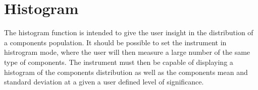 \section{Histogram} \label{sec:5_2_Histogram}
The histogram function is intended to give the user insight in the distribution of a components population. It should be possible to set the instrument in histrogram mode, where the user will then measure a large number of the same type of components. The instrument must then be capable of displaying a histogram of the components distribution as well as the components mean and standard deviation at a given a user defined level of significance.

